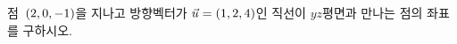 점~$(2{,}\mkern3mu\mathopen{}0{,}\mkern3mu\mathopen{}-1)$을 지나고 방향벡터가 $\vec{u}=(1{,}\mkern3mu\mathopen{}2{,}\mkern3mu\mathopen{}4)$인 직선이 \mbox{$yz$평면}과 만나는 점의 좌표를 구하시오.
